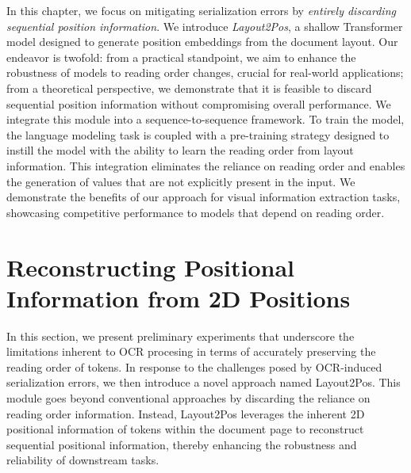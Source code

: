 In this chapter, we focus on mitigating serialization errors by \textit{entirely discarding sequential position information}. We introduce \textit{Layout2Pos}, a shallow Transformer model designed to generate position embeddings from the document layout. Our endeavor is twofold: from a practical standpoint, we aim to enhance the robustness of models to reading order changes, crucial for real-world applications; from a theoretical perspective, we demonstrate that it is feasible to discard sequential position information without compromising overall performance. We integrate this module into a sequence-to-sequence framework. To train the model, the language modeling task is coupled with a pre-training strategy designed to instill the model with the ability to learn the reading order from layout information. This integration eliminates the reliance on reading order and enables the generation of values that are not explicitly present in the input. We demonstrate the benefits of our approach for visual information extraction tasks, showcasing competitive performance to models that depend on reading order.


\section{Reconstructing Positional Information from 2D Positions}

In this section, we present preliminary experiments that underscore the limitations inherent to \ac{OCR} procesing in terms of accurately preserving the reading order of tokens. In response to the challenges posed by \ac{OCR}-induced serialization errors, we then introduce a novel approach named Layout2Pos. This module goes beyond conventional approaches by discarding the reliance on reading order information. Instead, Layout2Pos leverages the inherent 2D positional information of tokens within the document page to reconstruct sequential positional information, thereby enhancing the robustness and reliability of downstream tasks.

